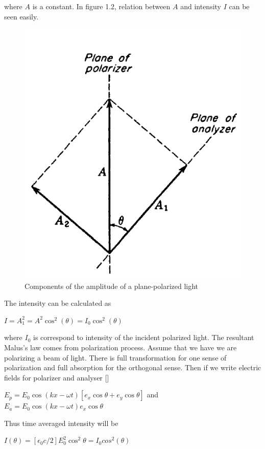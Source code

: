 \documentclass[a4paper,12pt]{report}
\begin{document}
where $A$ is a constant. In figure 1.2, relation between $A$ and intensity $I$ can be seen easily.
\newpage
\begin{figure}[h]
\centering
\includegraphics[width=0.4\linewidth, height=0.29\textheight]{malus}
\caption{Components of the amplitude of a plane-polarized light}
\label{fig:malus}
\end{figure}
The intensity can be calculated as 
\begin{center}
	$I=A_{1}^{2}=A^{2}\cos^{2}(\theta)=I_{0}\cos^{2}(\theta)$
\end{center}
where $I_{0}$ is correspond to intensity of the incident polarized light. The resultant Malus's law comes from polarization process. Assume that we have we are polarizing a beam of light. There is full transformation for one sense of polarization and full absorption for the orthogonal sense. Then if we write electric fields for polarizer and analyser []
\begin{center}
	$E_{p}=E_{0}\cos(kx-\omega t)[e_{x}\cos\theta+e_{y}\cos\theta]$ and\\
$E_{a}=E_{0}\cos(kx-\omega t)e_{x}\cos\theta$
\end{center}
Thus time averaged intensity will be 
\begin{center}
	$I(\theta)=[\epsilon_{0}c/2]E_{0}^{2}\cos^{2}\theta=I_{0}cos^{2}(\theta)$
\end{center}
\end{document}

